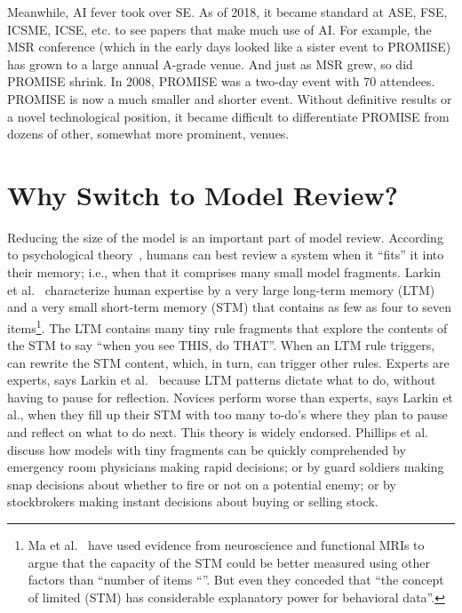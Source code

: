 \documentclass[sigconf,screen]{acmart}
\begin{document}
 
Meanwhile, AI fever took over SE. As of 2018,
it became standard at ASE, FSE, ICSME, ICSE, etc. to see papers
that make much use of AI. For example, the MSR conference (which in the early days looked like a sister event to PROMISE) has grown to a large annual A-grade venue.
And just as MSR grew, so did PROMISE shrink. In 2008, PROMISE was a two-day event with 70 attendees. PROMISE is now a much smaller and shorter event. Without definitive results or a novel technological position, it became difficult to differentiate PROMISE from dozens of other, somewhat more prominent, venues.


\section{  Why Switch to  Model Review?}


Reducing the size of the model is an important part of model review.
According to psychological theory~\cite{czerlinski1999good, gigerenzer1999good, martignon2003naive, brighton2006robust, martignon2008categorization, gigerenzer2008heuristics, phillips2017FFTrees, gigerenzer2011heuristic,neth2015heuristics},
humans can best review a system when it ``fits'' it into their memory; i.e., when that it comprises many small model
fragments. 
 Larkin et al.~\cite{Larkin1335} characterize human expertise by a very large long-term memory (LTM)
and a very small short-term memory (STM) that contains as few as four to seven items\footnote{Ma et al.~\cite{ma2014changing} 
 have used evidence from neuroscience and functional MRIs to
argue that the capacity of the STM could be better measured using other factors than ``number of
items ``''. But even they conceded that ``the concept of limited (STM) has considerable
explanatory power for behavioral data''.}.
The LTM contains  many tiny rule fragments
that explore the contents
of the STM to say ``when you see THIS, do THAT''.
When an LTM rule triggers,  can rewrite the STM content, which,
in turn, can trigger other rules.
Experts are experts, says Larkin et al.~\cite{Larkin1335} because LTM patterns dictate what to do, without having to pause for reflection. Novices perform worse than experts,
says Larkin et al., when they fill up their STM with too many to-do's where they plan to pause and reflect on what to do next.  
This theory is widely endorsed.  
 Phillips et al.~\cite{phillips2017FFTrees} discuss how models with tiny fragments can be quickly comprehended by emergency room physicians making rapid decisions; or by guard soldiers making snap decisions about whether to fire or not on a potential enemy; or by stockbrokers making instant decisions about buying or selling stock. 
\end{document}
